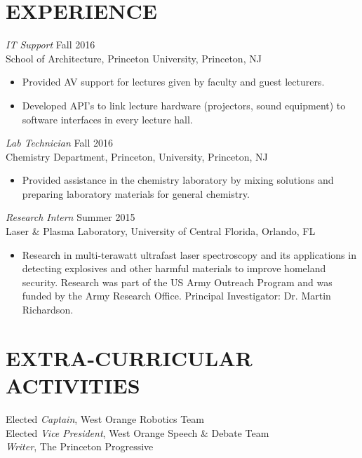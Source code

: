 \documentclass[margin]{res}
\begin{document}
\begin{resume}
\section{EXPERIENCE} {\sl IT Support} \hfill Fall 2016 \\
                School of Architecture, 
                Princeton University, Princeton, NJ 
                 \begin{itemize}  \itemsep -2pt %
                 \item Provided AV support for lectures given by faculty
                 and guest lecturers.
                \item   Developed API's to link lecture hardware (projectors,
                sound equipment) to software interfaces in every lecture hall.
                \end{itemize}
 
                {\sl Lab Technician} \hfill            Fall 2016 \\
                Chemistry Department, Princeton, University, Princeton, NJ
                 \begin{itemize}  \itemsep -2pt %
                 \item Provided assistance in the chemistry laboratory by
                 mixing solutions and preparing laboratory materials for 
                 general chemistry.
                 \end{itemize} 

                {\sl Research Intern} \hfill        Summer 2015 \\
                Laser \& Plasma Laboratory, University of Central Florida, Orlando, FL
                  \begin{itemize}
                   \item Research in multi-terawatt ultrafast laser spectroscopy 
                   and its applications in detecting explosives and other harmful 
                   materials to improve homeland security. Research was part of 
                   the US Army Outreach Program and was funded by the Army 
                   Research Office. Principal Investigator: Dr. Martin Richardson.
                   \end{itemize} 
 

\section{EXTRA-CURRICULAR \\ ACTIVITIES}             
            Elected {\it Captain}, West Orange Robotics Team \\
            Elected {\it Vice President}, West Orange Speech \& Debate Team \\
             {\it Writer}, The Princeton Progressive\\
 

\end{resume}
\end{document}
